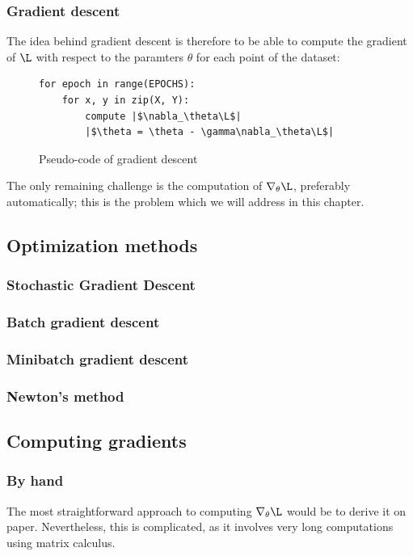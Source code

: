 \subsubsection{Gradient descent}
The idea behind gradient descent is therefore to be able to compute the gradient of $\L$ with respect to the paramters $\theta$ for each point of the dataset:
\begin{figure}[H]
    \centering 
    \begin{minipage}{0.4\textwidth}
    \begin{verbatim}
for epoch in range(EPOCHS):
    for x, y in zip(X, Y):
        compute |$\nabla_\theta\L$|
        |$\theta = \theta - \gamma\nabla_\theta\L$|
    \end{verbatim}
    \end{minipage}
    \caption{Pseudo-code of gradient descent}
\end{figure}
The only remaining challenge is the computation of $\nabla_\theta\L$, preferably automatically; this is the problem which we will address in this chapter.

\subsection{Optimization methods}
\subsubsection{Stochastic Gradient Descent}
\subsubsection{Batch gradient descent}
\subsubsection{Minibatch gradient descent}
\subsubsection{Newton's method}

\subsection{Computing gradients}
\subsubsection{By hand}
The most straightforward approach to computing $\nabla_\theta\L$ would be to derive it on paper. Nevertheless, this is complicated, as it involves very long computations using matrix calculus.

